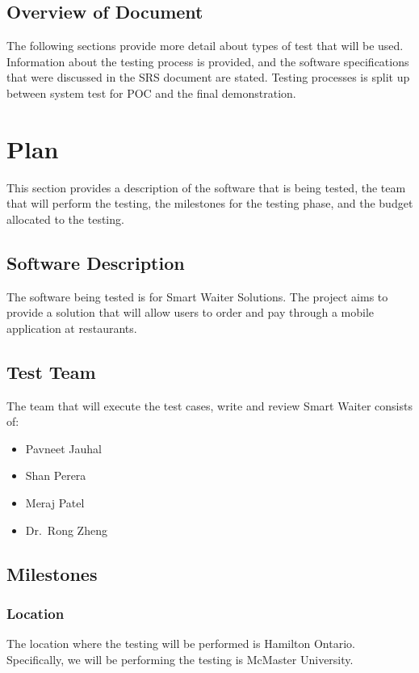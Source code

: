\documentclass[12pt]{article}
\begin{document}
\subsection{Overview of Document }
The following sections provide more detail about types of test that will be used. Information about the testing process is provided, and the software specifications
that were discussed in the SRS document are stated. Testing processes is split up between system test for POC and the final demonstration. 

%
%

\section{Plan}
This section provides a description of the software that is being tested, the team that will
perform the testing, the milestones for the testing phase, and the budget allocated to the testing. 

\subsection{Software Description}
The software being tested is for Smart Waiter Solutions. The project aims to provide a solution that will allow users to order and pay through a mobile application at restaurants. 

\subsection{Test Team} 
The team that will execute the test cases, write and review Smart Waiter consists of:

\begin{itemize}
 \item Pavneet Jauhal
 \item Shan Perera
 \item Meraj Patel
 \item Dr.\ Rong Zheng
\end{itemize}  

\subsection{Milestones}

\subsubsection{Location}
The location where the testing will be performed is Hamilton Ontario. Specifically, we will be performing the testing is McMaster University. 
\end{document}
